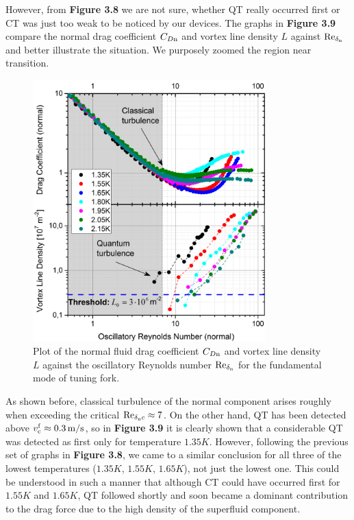 However, from {\sffamily\textbf{Figure 3.8}} we are not sure, whether QT really occurred first or CT was just too weak to be noticed by our devices. The graphs in {\sffamily\textbf{Figure 3.9}} compare the normal drag coefficient $ C_{D\mathrm{n}} $ and vortex line density $ L $ against $ \text{Re}_{\delta_{\mathrm{n}}} $ and better illustrate the situation. We purposely zoomed the region near transition. 


\begin{figure}[h!]
	\centering
	\includegraphics[width=0.8\textwidth]{graphs/Merged_C+L_Ren_fund}
	\caption{Plot of the normal fluid drag coefficient $ C_{D\mathrm{n}} $ and vortex line density $ L $ against the oscillatory Reynolds number $ \text{Re}_{\delta_{\mathrm{n}}} $ for the fundamental mode of tuning fork.}
\end{figure}

As shown before, classical turbulence of the normal component arises roughly when exceeding the critical $ \text{Re}_{\delta_{\mathrm{n}}c} \approx 7$. On the other hand, QT has been detected above $ v_{\mathrm{c}}^{\mathrm{f}} \approx 0.3 \,\mathrm{m/s}$, so in {\sffamily\textbf{Figure 3.9}} it is clearly shown that a considerable QT was detected as first only for temperature $ 1.35 \unit{K} $. However, following the previous set of graphs in {\sffamily\textbf{Figure 3.8}}, we came to a similar conclusion for all three of the lowest temperatures ($ 1.35 \unit{K} $, $ 1.55 \unit{K} $, $ 1.65 \unit{K} $), not just the lowest one. This could be understood in such a manner that although CT could have occurred first for $ 1.55 \unit{K} $ and $ 1.65 \unit{K} $, QT followed shortly and soon became a dominant contribution to the drag force due to the high density of the superfluid component.

